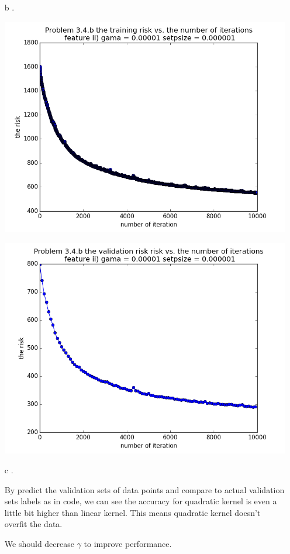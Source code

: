 \documentclass[11pt]{article}
\begin{document}
\begin{itemize}
\begin{itemize}
\item[b].

\includegraphics[scale=0.6]{14}

\includegraphics[scale=0.6]{15}

\item[c].

By predict the validation sets of data points and compare to actual validation sets labels as in code, we can see the accuracy for quadratic kernel is even a little bit higher than linear kernel. This means quadratic kernel doesn't overfit the data.

We should decrease $\gamma$ to improve performance.


\end{itemize}
\end{itemize}
\end{document}
